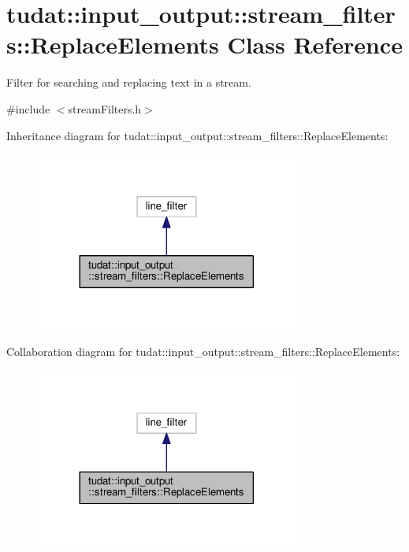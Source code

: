 \hypertarget{classtudat_1_1input__output_1_1stream__filters_1_1ReplaceElements}{}\section{tudat\+:\+:input\+\_\+output\+:\+:stream\+\_\+filters\+:\+:Replace\+Elements Class Reference}
\label{classtudat_1_1input__output_1_1stream__filters_1_1ReplaceElements}


Filter for searching and replacing text in a stream.  




{\ttfamily \#include $<$stream\+Filters.\+h$>$}



Inheritance diagram for tudat\+:\+:input\+\_\+output\+:\+:stream\+\_\+filters\+:\+:Replace\+Elements\+:
\nopagebreak
\begin{figure}[H]
\begin{center}
\leavevmode
\includegraphics[width=245pt]{classtudat_1_1input__output_1_1stream__filters_1_1ReplaceElements__inherit__graph}
\end{center}
\end{figure}


Collaboration diagram for tudat\+:\+:input\+\_\+output\+:\+:stream\+\_\+filters\+:\+:Replace\+Elements\+:
\nopagebreak
\begin{figure}[H]
\begin{center}
\leavevmode
\includegraphics[width=245pt]{classtudat_1_1input__output_1_1stream__filters_1_1ReplaceElements__coll__graph}
\end{center}
\end{figure}
